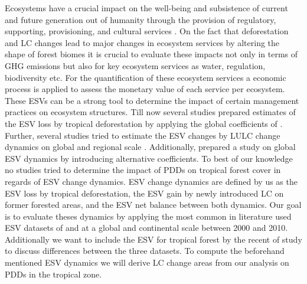 	Ecosystems have a crucial impact on the well-being and subsistence of current and future generation out of humanity through the provision of regulatory, supporting, provisioning, and cultural services \citep{Costanza1997}. On the fact that deforestation and \ac{LC} changes lead to major changes in ecosystem services by altering the shape of forest biomes it is crucial to evaluate these impacts not only in terms of \ac{GHG} emissions but also for key ecosystem services as water, regulation, biodiversity etc. For the quantification of these ecosystem services a economic process is applied to assess the monetary value of each service per ecosystem. These \acp{ESV} can be a strong tool to determine the impact of certain management practices on ecosystem structures. Till now several studies prepared estimates of the \ac{ESV} loss by tropical deforestation by applying the global coefficients of \citeauthor{Costanza2014} \citep{Song2018,Costanza2014}. Further, several studies tried to estimate the \ac{ESV} changes by \ac{LULC} change dynamics on global and regional scale \citep{Costanza1997,Sannigrahi2018,Wang2006,Kreuter2001,Zhao2004}. Additionally, \citet{Groot2012} prepared a study on global \ac{ESV} dynamics by introducing alternative coefficients. To best of our knowledge no studies tried to determine the impact of \acp{PDD} on tropical forest cover in regards of \ac{ESV} change dynamics. \ac{ESV} change dynamics are defined by us as the \ac{ESV} loss by tropical deforestation, the \ac{ESV} gain by newly introduced \ac{LC} on former forested areas, and the \ac{ESV} net balance between both dynamics. Our goal is to evaluate theses dynamics by applying the most common in literature used \ac{ESV} datasets of \citeauthor{Costanza2014} and \citeauthor{Groot2012} at a global and continental scale between 2000 and 2010. Additionally we want to include the \ac{ESV} for tropical forest by the recent of study \citet{Siikamaki2015} to discuss differences between the three datasets. To compute the beforehand mentioned \ac{ESV} dynamics we will derive \ac{LC} change areas from our analysis on \acp{PDD} in the tropical zone.

